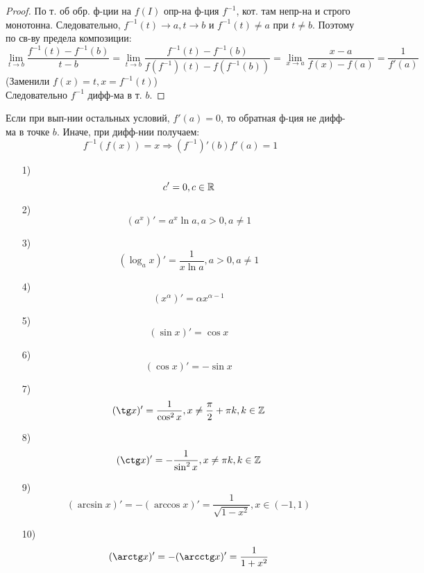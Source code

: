 \begin{proof}
По т. об обр. ф-ции на $f(I)$ опр-на ф-ция $f^{-1}$, кот. там непр-на и строго монотонна. Следовательно, $f^{-1}(t) \rightarrow a, t \rightarrow b$ и $f^{-1}(t) \neq a$ при $t \neq b$. Поэтому по св-ву предела композиции:
\[
\lim_{t\to b} \frac{f^{-1}(t) - f^{-1}(b)}{t - b} = \lim_{t\to b} \frac{f^{-1}(t) - f^{-1}(b)}{f(f^{-1})(t) - f(f^{-1}(b))} = \lim_{x\to a} \frac{x - a}{f(x) - f(a)} = \frac{1}{f'(a)}
\]
(Заменили $f(x) = t, x = f^{-1}(t)$) \\
Следовательно $f^{-1}$ дифф-ма в т. $b$.
\end{proof}
\begin{note}
Если при вып-нии остальных условий, $f'(a) = 0$, то обратная ф-ция не дифф-ма в точке $b$. Иначе, при дифф-нии получаем:
\[
  f^{-1}(f(x)) = x \Rightarrow (f^{-1})'(b)f'(a) = 1
\]
\end{note}
\begin{theorem}
\begin{itemize}
  \item [1) ] \[
  c' = 0, c \in \mathbb{R}
  \]
\item [2) ] \[
  (a^{x})' = a^{x}\ln a, a > 0, a \neq 1
\]
\item [3) ] \[
  (\log_a x)' = \frac{1}{x \ln a}, a > 0, a \neq 1
\]
\item [4) ] \[
  (x^{\alpha})' = \alpha x^{\alpha - 1}
\]
\item [5) ] \[
  (\sin x)' = \cos x
\]
\item [6) ] \[
  (\cos x)' = -\sin x
\]
\item [7) ] \[
    (\tg x)' = \frac{1}{\cos^{2}x}, x \neq \frac{\pi}{2} + \pi k, k \in \Z
\]
\item [8) ] \[
    (\ctg x)' = -\frac{1}{\sin^{2}x}, x \neq \pi k, k \in \Z
\]
\item [9) ] \[
  (\arcsin x)' = -(\arccos x)' = \frac{1}{\sqrt{1 - x^{2}}}, x \in (-1, 1)
\]
  \item [10) ] \[
      (\arctg x)' = -(\arcctg x)' = \frac{1}{1 + x^{2}}
  \]
\end{itemize}
\end{theorem}
